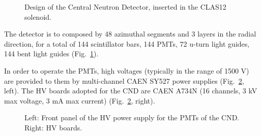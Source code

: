 \documentclass[12pt]{article}
\begin{document}
\begin{figure}
\begin{center}
\centering
{}
\vspace{-2.5cm}
\caption {Design of the Central Neutron Detector, inserted in the CLAS12 solenoid.}
\label{cnd_nice}
\end{center}
\end{figure}

The detector is to composed by 48 azimuthal segments and 3 layers in the radial direction, for a total of 144 scintillator bars, 144 PMTs, 72 u-turn light guides, 144 bent light guides (Fig.~\ref{cnd_nice}). 

In order to operate the PMTs, high voltages (typically in the range of 1500 V) are provided to them by multi-channel CAEN SY527 power supplies (Fig.~\ref{hv_ps_figure}, left). The HV boards adopted for the CND are CAEN A734N (16 channels, 3 kV max voltage, 3 mA max current) (Fig.~\ref{hv_ps_figure}, right). 
\begin{figure}
\begin{center}
\caption {Left: Front panel of the HV power supply for the PMTs of the CND. Right: HV boards.}
\label{hv_ps_figure}
\end{center}
\end{figure}
\end{document}
